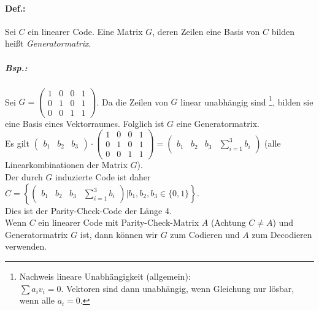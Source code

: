 \documentclass{scrreprt}
\begin{document}
\paragraph{Def.:} Sei $C$ ein linearer Code. Eine Matrix $G$, deren Zeilen eine Basis von $C$ bilden heißt \emph{Generatormatrix}.

\subparagraph{Bsp.:} Sei $G=\begin{pmatrix}
1 & 0 & 0 & 1\\
0 & 1 & 0 & 1 \\
0 & 0 & 1 & 1
\end{pmatrix}$. Da die Zeilen von $G$ linear unabhängig sind \footnote{Nachweis lineare Unabhängigkeit (allgemein): \\
$\sum a_i v_i=0$. Vektoren sind dann unabhängig, wenn Gleichung nur lösbar, wenn alle $a_i=0$.}, bilden  sie eine Basis eines Vektorraumes. Folglich ist $G$ eine Generatormatrix.\\
Es gilt $\begin{pmatrix}
b_1 & b_2 & b_3
\end{pmatrix}\cdot \begin{pmatrix}
1 & 0 & 0 & 1\\
0 & 1 & 0 & 1 \\
0 & 0 & 1 & 1
\end{pmatrix}= \begin{pmatrix}
b_1 & b_2 & b_3 & \sum_{i=1}^3 b_i
\end{pmatrix}$ (alle Linearkombinationen der Matrix $G$). \\
Der durch $G$ induzierte Code ist daher $C=\left\lbrace\begin{pmatrix}
b_1 & b_2 & b_3 & \sum_{i=1}^3 b_i
\end{pmatrix}|b_1,b_2,b_3 \in \{0,1\}\right\rbrace$. \\
Dies ist der Parity-Check-Code der Länge 4.\bigskip\\
Wenn $C$ ein linearer Code mit Parity-Check-Matrix $A$ (Achtung $C\not = A$) und Generatormatrix $G$ ist, dann können wir $G$ zum Codieren und $A$ zum Decodieren verwenden.
\end{document}
